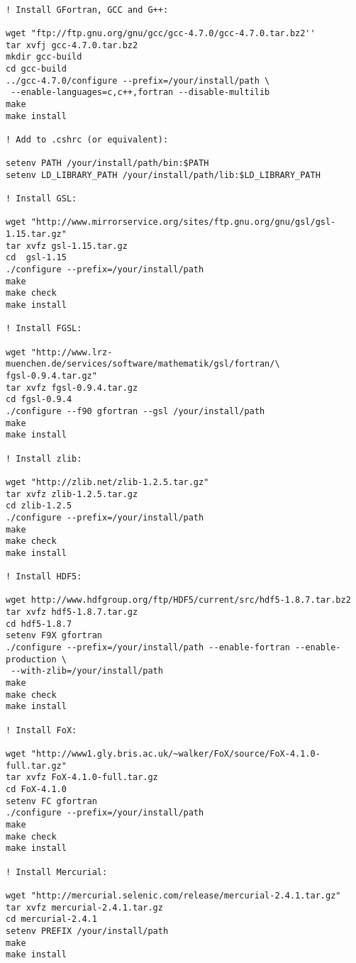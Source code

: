 \begin{lstlisting}[language=simple,stringstyle=\ttfamily,commentstyle=\itshape]

! Install GFortran, GCC and G++:

wget "ftp://ftp.gnu.org/gnu/gcc/gcc-4.7.0/gcc-4.7.0.tar.bz2''
tar xvfj gcc-4.7.0.tar.bz2
mkdir gcc-build
cd gcc-build
../gcc-4.7.0/configure --prefix=/your/install/path \
 --enable-languages=c,c++,fortran --disable-multilib
make
make install

! Add to .cshrc (or equivalent):

setenv PATH /your/install/path/bin:$PATH                                                                                           
setenv LD_LIBRARY_PATH /your/install/path/lib:$LD_LIBRARY_PATH

! Install GSL:

wget "http://www.mirrorservice.org/sites/ftp.gnu.org/gnu/gsl/gsl-1.15.tar.gz"
tar xvfz gsl-1.15.tar.gz
cd  gsl-1.15
./configure --prefix=/your/install/path
make
make check
make install

! Install FGSL:

wget "http://www.lrz-muenchen.de/services/software/mathematik/gsl/fortran/\
fgsl-0.9.4.tar.gz"
tar xvfz fgsl-0.9.4.tar.gz
cd fgsl-0.9.4
./configure --f90 gfortran --gsl /your/install/path
make
make install

! Install zlib:

wget "http://zlib.net/zlib-1.2.5.tar.gz"
tar xvfz zlib-1.2.5.tar.gz
cd zlib-1.2.5
./configure --prefix=/your/install/path
make
make check
make install

! Install HDF5:

wget http://www.hdfgroup.org/ftp/HDF5/current/src/hdf5-1.8.7.tar.bz2
tar xvfz hdf5-1.8.7.tar.gz
cd hdf5-1.8.7
setenv F9X gfortran
./configure --prefix=/your/install/path --enable-fortran --enable-production \
 --with-zlib=/your/install/path
make
make check
make install

! Install FoX:

wget "http://www1.gly.bris.ac.uk/~walker/FoX/source/FoX-4.1.0-full.tar.gz"
tar xvfz FoX-4.1.0-full.tar.gz
cd FoX-4.1.0
setenv FC gfortran
./configure --prefix=/your/install/path
make
make check
make install

! Install Mercurial:

wget "http://mercurial.selenic.com/release/mercurial-2.4.1.tar.gz"
tar xvfz mercurial-2.4.1.tar.gz
cd mercurial-2.4.1
setenv PREFIX /your/install/path
make
make install


\end{lstlisting}
